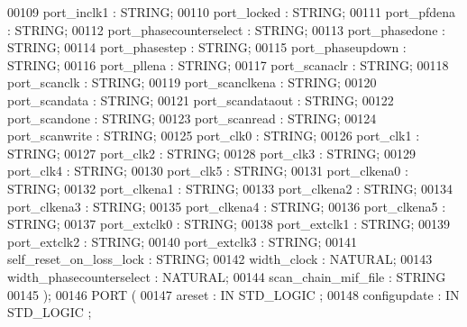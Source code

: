 \begin{DoxyCode}
{00109         port\_inclk1     : \textcolor{comment}{STRING};
00110         port\_locked     : \textcolor{comment}{STRING};
00111         port\_pfdena     : \textcolor{comment}{STRING};
00112         port\_phasecounterselect     : \textcolor{comment}{STRING};
00113         port\_phasedone      : \textcolor{comment}{STRING};
00114         port\_phasestep      : \textcolor{comment}{STRING};
00115         port\_phaseupdown        : \textcolor{comment}{STRING};
00116         port\_pllena     : \textcolor{comment}{STRING};
00117         port\_scanaclr       : \textcolor{comment}{STRING};
00118         port\_scanclk        : \textcolor{comment}{STRING};
00119         port\_scanclkena     : \textcolor{comment}{STRING};
00120         port\_scandata       : \textcolor{comment}{STRING};
00121         port\_scandataout        : \textcolor{comment}{STRING};
00122         port\_scandone       : \textcolor{comment}{STRING};
00123         port\_scanread       : \textcolor{comment}{STRING};
00124         port\_scanwrite      : \textcolor{comment}{STRING};
00125         port\_clk0       : \textcolor{comment}{STRING};
00126         port\_clk1       : \textcolor{comment}{STRING};
00127         port\_clk2       : \textcolor{comment}{STRING};
00128         port\_clk3       : \textcolor{comment}{STRING};
00129         port\_clk4       : \textcolor{comment}{STRING};
00130         port\_clk5       : \textcolor{comment}{STRING};
00131         port\_clkena0        : \textcolor{comment}{STRING};
00132         port\_clkena1        : \textcolor{comment}{STRING};
00133         port\_clkena2        : \textcolor{comment}{STRING};
00134         port\_clkena3        : \textcolor{comment}{STRING};
00135         port\_clkena4        : \textcolor{comment}{STRING};
00136         port\_clkena5        : \textcolor{comment}{STRING};
00137         port\_extclk0        : \textcolor{comment}{STRING};
00138         port\_extclk1        : \textcolor{comment}{STRING};
00139         port\_extclk2        : \textcolor{comment}{STRING};
00140         port\_extclk3        : \textcolor{comment}{STRING};
00141         self\_reset\_on\_loss\_lock     : \textcolor{comment}{STRING};
00142         width\_clock     : \textcolor{comment}{NATURAL};
00143         width\_phasecounterselect        : \textcolor{comment}{NATURAL};
00144         scan\_chain\_mif\_file     : \textcolor{comment}{STRING}
00145     );
00146     \textcolor{keywordflow}{PORT} (
00147             areset  : \textcolor{keywordflow}{IN} \textcolor{comment}{STD\_LOGIC} ;
00148             configupdate    : \textcolor{keywordflow}{IN} \textcolor{comment}{STD\_LOGIC} ;
}
\end{DoxyCode}
